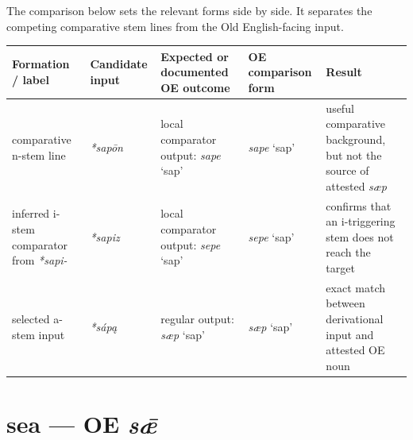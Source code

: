 \documentclass[
  british,
  a4paper,
  openany]{book}
\newcounter{none} %
\providecommand{\texorpdfstring}[2]{#1}
\begin{document}
The comparison below sets the relevant forms side by side. It separates
the competing comparative stem lines from the Old English-facing input.

{\def\LTcaptype{none} %
\begin{longtable}[]{@{}
  >{\raggedright\arraybackslash}p{}
  >{\raggedright\arraybackslash}p{}
  >{\raggedright\arraybackslash}p{}
  >{\raggedright\arraybackslash}p{}
  >{\raggedright\arraybackslash}p{}@{}}
\toprule\noalign{}
\begin{minipage}[b]{\linewidth}\raggedright
Formation / label
\end{minipage} & \begin{minipage}[b]{\linewidth}\raggedright
Candidate input
\end{minipage} & \begin{minipage}[b]{\linewidth}\raggedright
Expected or documented OE outcome
\end{minipage} & \begin{minipage}[b]{\linewidth}\raggedright
OE comparison form
\end{minipage} & \begin{minipage}[b]{\linewidth}\raggedright
Result
\end{minipage} \\
\midrule\noalign{}
\endhead
\bottomrule\noalign{}
\endlastfoot
comparative n-stem line & {\emph{*sapōn}} & local comparator output:
{\emph{sape}} `sap' & {\emph{sape}} `sap' & useful comparative
background, but not the source of attested \emph{sæp} \\
inferred i-stem comparator from \emph{*sapi-} & {\emph{*sapiz}} & local
comparator output: {\emph{sepe}} `sap' & {\emph{sepe}} `sap' & confirms
that an i-triggering stem does not reach the target \\
selected a-stem input & {\emph{*sápą}} & regular output: {\emph{sæp}}
`sap' & {\emph{sæp}} `sap' & exact match between derivational input and
attested OE noun \\
\end{longtable}
}

\section{\texorpdfstring{sea --- OE
\emph{sǣ}}{sea --- OE sǣ}}\label{sea-oe-sux1e3}
\end{document}

